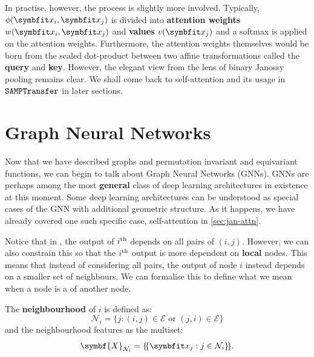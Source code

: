 In practise, however, the process is slightly more involved. Typically, $\phi(\bfitx_i, \bfitx_j)$ is divided into \textbf{attention weights} $w(\bfitx_i, \bfitx_j)$ and \textbf{values} $v(\bfitx_j)$ and a softmax is applied on the attention weights. Furthermore, the attention weights themselves would be born from the scaled dot-product between two affine transformations called the \textbf{query} and \textbf{key}.
However, the elegant view from the lens of binary Janossy pooling remains clear. We shall come back to self-attention and its usage in $\texttt{SAMPTransfer}$ in later sections.

\section{Graph Neural Networks}\label{sec:graph-nn}

Now that we have described graphs and permutation invariant and equivariant functions, we can begin to talk about Graph Neural Networks (GNNs). GNNs are perhaps among the most \textbf{general} class of deep learning architectures in existence at this moment. Some deep learning architectures can be understood as special cases of the GNN with additional geometric structure. As it happens, we have already covered one such specific case, self-attention in \cref{sec:jan-attn}.

Notice that in , the output of $i\textsuperscript{th}$ depends on all pairs of $(i, j)$. However, we can also constrain this so that the $i\textsuperscript{th}$ output is more dependent on \textbf{local} nodes. This means that instead of considering all pairs, the output of node $i$ instead depends on a smaller set of neighbours. We can formalise this to define what we mean when a node is a   of another node.

The \textbf{neighbourhood} of $i$ is defined as:
\begin{equation}
\mathcal{N}_{i}=\{j:(i, j) \in \mathcal{E} \text { or }(j, i) \in \mathcal{E}\}
\end{equation}
and the neighbourhood features as the multiset:
\begin{equation}
\symbf{X}_{\mathcal{N}_{i}}=\ldblbrace\bfitx_{j}: j \in \mathcal{N}_{i}\rdblbrace .
\end{equation}

